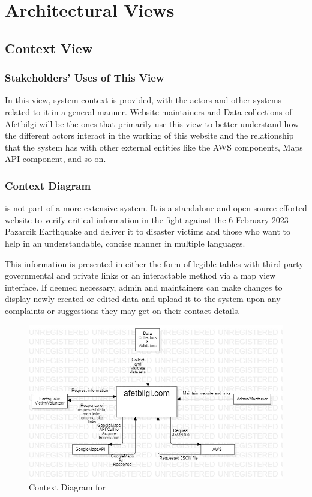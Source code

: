 \section{Architectural Views}

\subsection{Context View}

\subsubsection{Stakeholders' Uses of This View}

In this view, system context is provided, with the actors and other systems related to it in a general manner. Website maintainers and Data collections of Afetbilgi will be the ones that primarily use this view to better understand how the different actors interact in the working of this website and the relationship that the system has with other external entities like the AWS components, Maps API component, and so on.

\subsubsection{Context Diagram}

\afetbilgi \cite{afetbilgi} is not part of a more extensive system. It is a standalone and open-source efforted website to verify critical information in the fight against the 6 February 2023 Pazarcik Earthquake and deliver it to disaster victims and those who want to help in an understandable, concise manner in multiple languages.

This information is presented in either the form of legible tables with third-party governmental and private links or an interactable method via a map view interface. If deemed necessary, admin and maintainers can make changes to display newly created or edited data and upload it to the system upon any complaints or suggestions they may get on their contact details.

\begin{figure}[H]
  \centering
  \includegraphics[width=\linewidth]{img/context-diagram.jpg}
  \caption{Context Diagram for \afetbilgi}
\end{figure}

